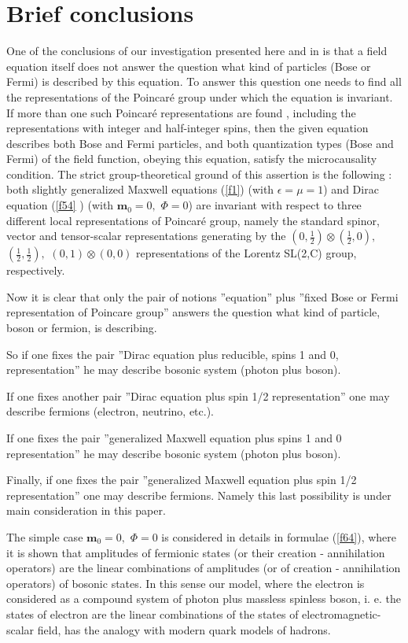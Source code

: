 \documentclass[a4paper,12pt]{article}
\begin{document}
\section{Brief conclusions}

One of the conclusions of our investigation presented here and in \cite
{SK,S2} is that a field equation itself does not answer the question what
kind of particles (Bose or Fermi) is described by this equation. To answer
this question one needs to find all the representations of the Poincar\'e
group under which the equation is invariant. If more than one such
Poincar\'e representations are found \cite{SK}, including the
representations with integer and half-integer spins, then the given equation
describes both Bose and Fermi particles, and both quantization types (Bose
and Fermi) \cite{S2} of the field function, obeying this equation, satisfy
the microcausality condition. The strict group-theoretical ground of this
assertion is the following \cite{SK}: both slightly generalized Maxwell
equations (\ref{f1}) (with $\epsilon =\mu =1$) and Dirac equation (\ref{f54}%
) (with $\mathbf{m}_0=0,$ $\Phi =0$) are invariant with respect to three
different local representations of Poincar\'e group, namely the standard
spinor, vector and tensor-scalar representations generating by the $(0,\frac
12)\otimes (\frac 12,0),$ $(\frac 12,\frac 12),$ $(0,1)\otimes (0,0)$
representations of the Lorentz SL(2,C) group, respectively.

Now it is clear that only the pair of notions ''equation'' plus ''fixed Bose
or Fermi representation of Poincare group'' answers the question what kind
of particle, boson or fermion, is describing.

So if one fixes the pair ''Dirac equation plus reducible, spins 1 and 0,
representation'' he may describe bosonic system (photon plus boson).

If one fixes another pair ''Dirac equation plus spin 1/2 representation''
one may describe fermions (electron, neutrino, etc.).

If one fixes the pair ''generalized Maxwell equation plus spins 1 and 0
representation'' he may describe bosonic system (photon plus boson).

Finally, if one fixes the pair ''generalized Maxwell equation plus spin 1/2
representation'' one may describe fermions. Namely this last possibility is
under main consideration in this paper.

The simple case $\mathbf{m}_0=0,$ $\Phi =0$ is considered in details in
formulae (\ref{f64}), where it is shown that amplitudes of fermionic states
(or their creation - annihilation operators) are the linear combinations of
amplitudes (or of creation - annihilation operators) of bosonic states. In
this sense our model, where the electron is considered as a compound system
of photon plus massless spinless boson, i. e. the states of electron are the
linear combinations of the states of electromagnetic-scalar field, has the
analogy with modern quark models of hadrons.
\end{document}
